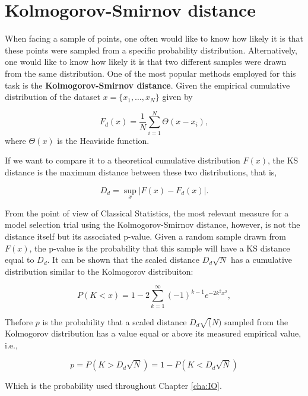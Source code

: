 \section{Kolmogorov-Smirnov distance}

When facing a sample of points, one often would like to know how likely it is that these points were sampled from a specific probability distribution. Alternatively, one would like to know how likely it is that two different samples were drawn from the same distribution. One of the most popular methods employed for this task is the
\textbf{Kolmogorov-Smirnov distance}\cite{wasserman2013}. Given the empirical cumulative distribution of the dataset $x = \{x_1, \ldots, x_N\}$ given by

\begin{equation}
F_d (x) = \frac{1}{N} \sum_{i=1}^N \Theta(x - x_i),
\end{equation}
where $\Theta(x)$ is the Heaviside function.

If we want to compare it to a theoretical
cumulative distribution $F(x)$, the KS distance is the maximum
distance between these two distributions, that is,

\begin{equation}
  \label{eq:a2_9}
  D_d = \sup_x |F(x) - F_d(x)|.
\end{equation}

From the point of view of Classical Statistics, the most relevant measure for a model selection trial using the
Kolmogorov-Smirnov distance, however, is not the distance itself but its associated p-value. Given a random sample drawn from $F(x)$, the p-value is the probability that this sample will have a KS distance equal to $D_d$. It can be shown that the scaled distance $D_d \sqrt{N}$ has a cumulative distribution similar to the Kolmogorov distribuiton:

\begin{equation}
  \label{eq:a2_1}
  P(K < x) = 1 - 2 \sum_{k=1}^\infty (-1)^{k-1}e^{-2k^2 x^2},
\end{equation}

Thefore $p$ is the probability that a scaled distance $D_d \sqrt(N)$ sampled from the Kolmogorov distribution has a value equal or above its measured empirical value, i.e.,

\begin{equation}
   p = P(K > D_d\sqrt{N}) = 1 - P(K< D_d \sqrt{N}) 
\end{equation}

Which is the probability used throughout Chapter \ref{cha:IO}.

